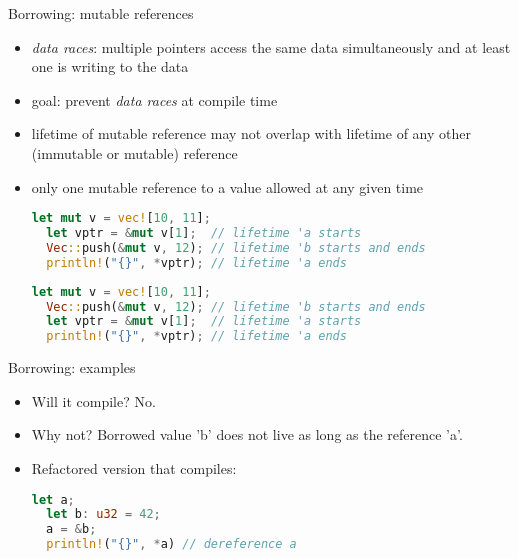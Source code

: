 \documentclass{beamer}
\begin{document}
\begin{frame}[fragile]{Borrowing: mutable references}
\begin{itemize}
  \item \emph{data races}: multiple pointers access the same data simultaneously and at least one is writing to the data
  \item goal: prevent \emph{data races} at compile time
  \item lifetime of mutable reference may not overlap with lifetime of any other (immutable or mutable) reference
  \item only one mutable reference to a value allowed at any given time

  \begin{lstlisting}[language=Rust]
  let mut v = vec![10, 11];
  let vptr = &mut v[1];  // lifetime 'a starts
  Vec::push(&mut v, 12); // lifetime 'b starts and ends
  println!("{}", *vptr); // lifetime 'a ends
  \end{lstlisting}
  \pause
  \begin{lstlisting}[language=Rust]
  let mut v = vec![10, 11];
  Vec::push(&mut v, 12); // lifetime 'b starts and ends
  let vptr = &mut v[1];  // lifetime 'a starts
  println!("{}", *vptr); // lifetime 'a ends
  \end{lstlisting}
\end{itemize}
\end{frame}


\begin{frame}[fragile]{Borrowing: examples}
\begin{itemize}
  \begin{lstlisting}[language=Rust]
  let a;
  {
    let b: u32 = 42;
    a = &b;
  }
  println!("{}", *a) // dereference a
  \end{lstlisting}

  \item Will it compile? \pause No.
  \item Why not? \pause Borrowed value 'b' does not live as long as the reference 'a'.
  \item Refactored version that compiles:\pause

  \begin{lstlisting}[language=Rust]
  let a;
  let b: u32 = 42;
  a = &b;
  println!("{}", *a) // dereference a
  \end{lstlisting}
\end{itemize}
\end{frame}
\end{document}

